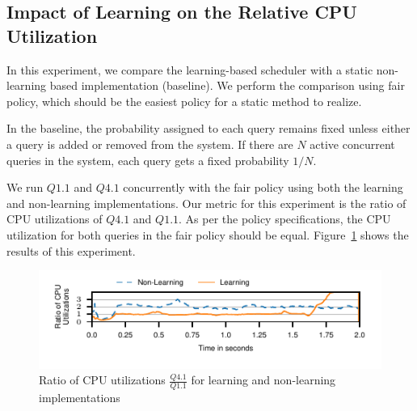 \subsection{Impact of Learning on the Relative CPU Utilization}\label{ssec:learning-impact-cpu-util}
In this experiment, we compare the learning-based scheduler with a static non-learning based implementation (baseline).
We perform the comparison using fair policy, which should be the easiest policy for a static method to realize.

In the baseline, the probability assigned to each query remains fixed unless either a query is added or removed from the system.
If there are $N$ active concurrent queries in the system, each query gets a fixed probability $1/N$.

We run $Q1.1$ and $Q4.1$ concurrently with the fair policy using both the learning and 
non-learning implementations.
Our metric for this experiment is the ratio of CPU utilizations of $Q4.1$ and $Q1.1$.
As per the policy specifications, the CPU utilization for both queries in the fair policy 
should be equal. %
Figure~\ref{fig:non-learning-comparison} shows the results of this experiment.

\begin{figure}[h]
	\centering
	\includegraphics[width=\columnwidth]{figures/q1-q11-ratio-cpu-util.pdf}
	\vspace{-2.6em}
	\caption{Ratio of CPU utilizations  $\frac{Q4.1}{Q1.1}$ for learning and non-learning 
		implementations}
	\label{fig:non-learning-comparison}
	\vspace{-0.9em}
\end{figure}

